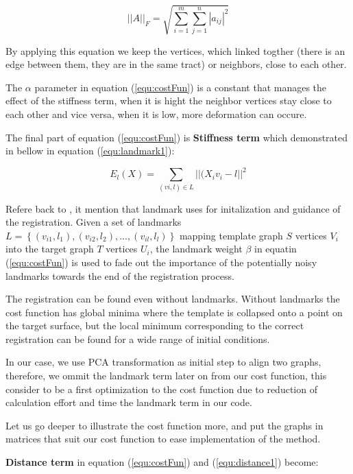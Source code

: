 \documentclass[../structure.tex]{subfiles}
\begin{document}
\begin{equation}
||A||_{F} = \sqrt{\sum_{i=1}^m \sum_{j=1}^n |a_{ij}|^2}
\label{equ:stiffness2}
\end{equation} 

By applying this equation we keep the vertices, which linked togther (there is an edge between them, they are in the same tract) or neighbors, close to each other.

The $\alpha$ parameter in equation (\ref{equ:costFun}) is a constant that manages the effect of the stiffness term, when it is hight the neighbor vertices stay close to each other and vice versa, when it is low, more deformation can occure.

The final part of equation (\ref{equ:costFun}) is \textbf{Stiffness term} which demonstrated in bellow in equation (\ref{equ:landmark1}):

\begin{equation}
E_{l}(X) = \sum_{(vi,l) \in L}||(X_{i}v_{i} - l||^2
\label{equ:landmark1}
\end{equation}

Refere back to \cite{Amberg2007}, it mention that landmark uses for initalization and guidance of the registration. Given a set of landmarks $L = \left\{(v_{i1},l_{1}),(v_{i2},l_{2}),...,(v_{il},l_{l})\right\}$ mapping template graph $S$ vertices $V_{i}$ into the target graph $T$ vertices $U_{i}$, the landmark weight $\beta$ in equatin (\ref{equ:costFun}) is used to fade out the importance of the potentially noisy landmarks towards the end of the registration process.

The registration can be found even without landmarks. Without landmarks the cost function has global minima where the template is collapsed onto a point on the target surface, but the local minimum corresponding to the correct registration can be found for a wide range of initial conditions.

In our case, we use PCA transformation as initial step to align two graphs, therefore, we ommit the landmark term later on from our cost function, this consider to be a first optimization to the cost function due to reduction of calculation effort and time the landmark term in our code.

Let us go deeper to illustrate the cost function more, and put the graphs in matrices that suit our cost function to ease implementation of the method.

\textbf{Distance term} in equation (\ref{equ:costFun}) and (\ref{equ:distance1}) become:
\end{document}
